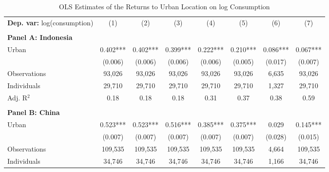 \begin{table}[htbp] \centering \begin{threeparttable}
 \caption{OLS Estimates of the Returns to Urban Location on log Consumption} 
 \label{tab:OLS_cons_urb_unb} 
\begin{tabular}{l ccccccc} \toprule  \textbf{Dep. var:}  log(consumption) 
                    &\multicolumn{1}{c}{(1)}   &\multicolumn{1}{c}{(2)}   &\multicolumn{1}{c}{(3)}   &\multicolumn{1}{c}{(4)}   &\multicolumn{1}{c}{(5)}   &\multicolumn{1}{c}{(6)}   &\multicolumn{1}{c}{(7)}   \\
                    &               &               &               &               &               &               &               \\
\textbf{Panel A: Indonesia} \\
Urban               &       0.402***&       0.402***&       0.399***&       0.222***&       0.210***&       0.086***&       0.067***\\
                    &     (0.006)   &     (0.006)   &     (0.006)   &     (0.006)   &     (0.005)   &     (0.017)   &     (0.007)   \\
\addlinespace
Observations        &      93,026   &      93,026   &      93,026   &      93,026   &      93,026   &       6,635   &      93,026   \\
Individuals         &      29,710   &      29,710   &      29,710   &      29,710   &      29,710   &       1,327   &      29,710   \\
Adj. R$^{2}$        &        0.18   &        0.18   &        0.18   &        0.31   &        0.37   &        0.38   &        0.59   \\
\cmidrule{2 -8}
                    &               &               &               &               &               &               &               \\
\textbf{Panel B: China} \\
Urban               &       0.523***&       0.523***&       0.516***&       0.385***&       0.375***&       0.029   &       0.145***\\
                    &     (0.007)   &     (0.007)   &     (0.007)   &     (0.007)   &     (0.007)   &     (0.028)   &     (0.015)   \\
\addlinespace
Observations        &     109,535   &     109,535   &     109,535   &     109,535   &     109,535   &       4,664   &     109,535   \\
Individuals         &      34,746   &      34,746   &      34,746   &      34,746   &      34,746   &       1,166   &      34,746   \\

\end{tabular}
\end{threeparttable}
\end{table}
